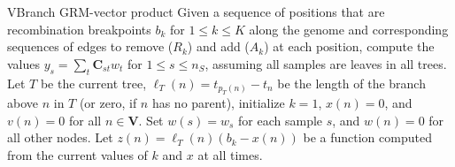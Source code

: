 \begin{taocpalg}{V}{Branch GRM-vector product}
{
    Given a sequence of positions that are recombination breakpoints $b_k$ for $1 \le k \le K$ 
    along the genome and corresponding sequences of edges to 
    remove ($R_k$) and add ($A_k$) at each position, 
    compute the values 
    $y_s=\sum_t\mathbf{C}_{st} w_t$ for $1 \le s \le n_S$, assuming all samples are leaves in all trees.
    Let $T$ be the current tree,
    $\ell_T(n) = t_{p_T(n)} - t_n$ be the length of the branch above $n$ in $T$ (or zero, if $n$ has no parent),
    initialize $k = 1$, $x(n) = 0$, and $v(n) = 0$ for all $n \in \mathbf{V}$.
    Set $w(s) = w_s$ for each sample $s$, and $w(n)=0$ for all other nodes.
    Let $z(n) = \ell_{T}(n) (b_k - x(n))$ be a function 
    computed from the current values of $k$ and $x$ at all times.
}




\end{taocpalg}


